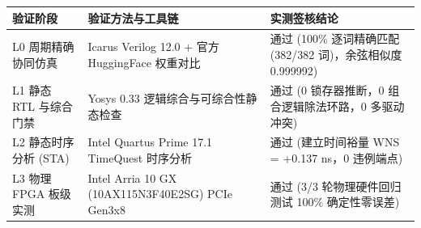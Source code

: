 \documentclass[11pt,a4paper]{article}
\begin{document}
{\footnotesize\renewcommand{\arraystretch}{1.14}\begin{longtable}{@{}L{0.24\textwidth}L{0.34\textwidth}L{0.34\textwidth}@{}}\toprule

\textbf{验证阶段} & \textbf{验证方法与工具链} & \textbf{实测签核结论}\\\midrule\endhead

L0 周期精确协同仿真 & Icarus Verilog 12.0 +\allowbreak{} 官方 HuggingFace 权重对比 & 通过 (\allowbreak{}100\% 逐词精确匹配 (\allowbreak{}382/\allowbreak{}382 词)\allowbreak{}，余弦相似度 0.999992)\allowbreak{}\\[2pt]

L1 静态 RTL 与综合门禁 & Yosys 0.33 逻辑综合与可综合性静态检查 & 通过 (\allowbreak{}0 锁存器推断，0 组合逻辑除法环路，0 多驱动冲突)\allowbreak{}\\[2pt]

L2 静态时序分析 (\allowbreak{}STA)\allowbreak{} & Intel Quartus Prime 17.1 TimeQuest 时序分析 & 通过 (\allowbreak{}建立时间裕量 WNS =\allowbreak{} +\allowbreak{}0.137 ns，0 违例端点)\allowbreak{}\\[2pt]

L3 物理 FPGA 板级实测 & Intel Arria 10 GX (\allowbreak{}10AX115N\allowbreak{}3F40E2SG)\allowbreak{} PCIe Gen3x8 & 通过 (\allowbreak{}3/\allowbreak{}3 轮物理硬件回归测试 100\% 确定性零误差)\allowbreak{}\\[2pt]

\bottomrule\end{longtable}}
\end{document}
